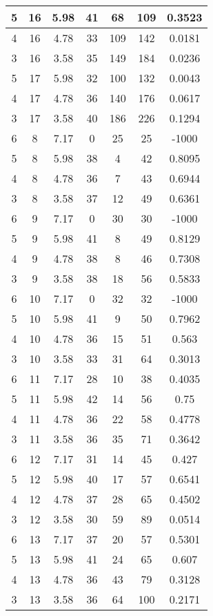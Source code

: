 \documentclass[letterpaper, 12pt]{article}
\begin{document}
\begin{longtable}{|c|c|c|c|c|c|c|}
\hline
5 & 16 & 5.98 & 41 & 68 & 109 & 0.3523 \\
\hline
4 & 16 & 4.78 & 33 & 109 & 142 & 0.0181 \\
\hline
3 & 16 & 3.58 & 35 & 149 & 184 & 0.0236 \\
\hline
5 & 17 & 5.98 & 32 & 100 & 132 & 0.0043 \\
\hline
4 & 17 & 4.78 & 36 & 140 & 176 & 0.0617 \\
\hline
3 & 17 & 3.58 & 40 & 186 & 226 & 0.1294 \\
\hline
6 & 8 & 7.17 & 0 & 25 & 25 & -1000 \\
\hline
5 & 8 & 5.98 & 38 & 4 & 42 & 0.8095 \\
\hline
4 & 8 & 4.78 & 36 & 7 & 43 & 0.6944 \\
\hline
3 & 8 & 3.58 & 37 & 12 & 49 & 0.6361 \\
\hline
6 & 9 & 7.17 & 0 & 30 & 30 & -1000 \\
\hline
5 & 9 & 5.98 & 41 & 8 & 49 & 0.8129 \\
\hline
4 & 9 & 4.78 & 38 & 8 & 46 & 0.7308 \\
\hline
3 & 9 & 3.58 & 38 & 18 & 56 & 0.5833 \\
\hline
6 & 10 & 7.17 & 0 & 32 & 32 & -1000 \\
\hline
5 & 10 & 5.98 & 41 & 9 & 50 & 0.7962 \\
\hline
4 & 10 & 4.78 & 36 & 15 & 51 & 0.563 \\
\hline
3 & 10 & 3.58 & 33 & 31 & 64 & 0.3013 \\
\hline
6 & 11 & 7.17 & 28 & 10 & 38 & 0.4035 \\
\hline
5 & 11 & 5.98 & 42 & 14 & 56 & 0.75 \\
\hline
4 & 11 & 4.78 & 36 & 22 & 58 & 0.4778 \\
\hline
3 & 11 & 3.58 & 36 & 35 & 71 & 0.3642 \\
\hline
6 & 12 & 7.17 & 31 & 14 & 45 & 0.427 \\
\hline
5 & 12 & 5.98 & 40 & 17 & 57 & 0.6541 \\
\hline
4 & 12 & 4.78 & 37 & 28 & 65 & 0.4502 \\
\hline
3 & 12 & 3.58 & 30 & 59 & 89 & 0.0514 \\
\hline
6 & 13 & 7.17 & 37 & 20 & 57 & 0.5301 \\
\hline
5 & 13 & 5.98 & 41 & 24 & 65 & 0.607 \\
\hline
4 & 13 & 4.78 & 36 & 43 & 79 & 0.3128 \\
\hline
3 & 13 & 3.58 & 36 & 64 & 100 & 0.2171 \\

\end{longtable}
\end{document}
